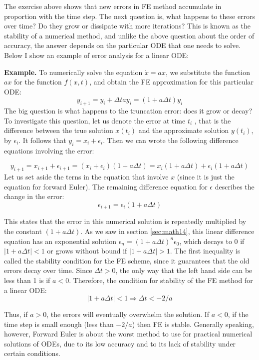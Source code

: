 \documentclass[
]{book}
\theoremstyle{definition}
\theoremstyle{definition}
\theoremstyle{definition}
\theoremstyle{remark}
\begin{document}
The exercise above shows that new errors in FE method accumulate in proportion with the time step. The next question is, what happens to these errors over time? Do they grow or dissipate with more iterations? This is known as the stability of a numerical method, and unlike the above question about the order of accuracy, the answer depends on the particular ODE that one needs to solve. Below I show an example of error analysis for a linear ODE:

\textbf{Example.} To numerically solve the equation \(\dot x = ax\), we substitute the function \(ax\) for the function \(f(x,t)\), and obtain the FE approximation for this particular ODE:
\[y_{i+1} = y_i + \Delta t a y_i = (1+a\Delta t) y_i\]
The big question is what happens to the truncation error: does it grow or decay? To investigate this question, let us denote the error at time \(t_i\) , that is the difference between the true solution \(x(t_i)\) and the approximate solution \(y(t_i)\), by \(\epsilon_i\). It follows that \(y_i = x_i + \epsilon_i\). Then we can wrote the following difference equations involving the error:

\[y_{i+1} = x_{i+1} + \epsilon_{i+1} = (x_i + \epsilon_i) (1+a\Delta t)  = x_i (1+a\Delta t) + \epsilon_i(1+a\Delta t)\]
Let us set aside the terns in the equation that involve \(x\) (since it is just the equation for forward Euler). The remaining difference equation for \(\epsilon\) describes the change in the error:
\[\epsilon_{i+1} = \epsilon_i(1+a\Delta t) \]

This states that the error in this numerical solution is repeatedly multiplied by the constant \((1+a\Delta t)\). As we saw in section \ref{sec:math14}, this linear difference equation has an exponential solution \(\epsilon_n = (1+a\Delta t)^n \epsilon_0\), which decays to 0 if \(|1+a\Delta t| < 1\) or grows without bound if \(|1+a\Delta t| > 1\). The first inequality is called the stability condition for the FE scheme, since it guarantees that the old errors decay over time. Since \(\Delta t >0\), the only way that the left hand side can be less than 1 is if \(a<0\). Therefore, the condition for stability of the FE method for a linear ODE:
\[|1 + a\Delta t| < 1 \Rightarrow \Delta t < -2/a\]

Thus, if \(a>0\), the errors will eventually overwhelm the solution. If \(a<0\), if the time step is small enough (less than \(-2/a\)) then FE is stable. Generally speaking, however, Forward Euler is about the worst method to use for practical numerical solutions of ODEs, due to its low accuracy and to its lack of stability under certain conditions.
\end{document}
